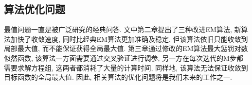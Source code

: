 \documentclass[a4paper,12pt,openany,oneside,utf-8]{ctexbook}
\newcommand{\sanhao}{\fontsize{15.75pt}{\baselineskip}\selectfont}
\begin{document}
\subsection{算法优化问题}
最值问题一直是被广泛研究的经典问答. 文中第二章提出了三种改进EM算法, 新算法加快了收敛速度, 同时比经典EM算法更加准确及稳定, 但该算法依旧只能收敛到局部最大值, 而不能保证获得全局最大值. 第三章通过修改的EM算法最大惩罚对数似然函数, 该算法一方面需要通过交叉验证进行调参, 另一方在每次迭代的M步都需要求解方程组, 这两者都消耗了大量的计算时间, 同样地, 该算法无法保证收敛到目标函数的全局最大值. 因此, 相关算法的优化问题将是我们未来的工作之一.



\newpage
\pagestyle{fancy}
\begin{center}
\heiti\sanhao {参考文献}
\end{center}


\end{document}
